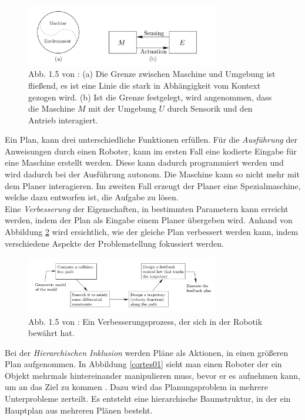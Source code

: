 \begin{figure} %
	\centering
	\includegraphics[width=0.75\textwidth]{images/img224.png}
	\caption{Abb. 1.5 von \cite[~S. 20]{Lav06}:  (a) Die Grenze zwischen Maschine und Umgebung ist fließend, es ist eine Linie die stark in Abhängigkeit vom Kontext gezogen wird. (b) Ist die Grenze festgelegt, wird angenommen, dass die Maschine $M$ mit der Umgebung $U$ durch Sensorik und den Antrieb interagiert.}
	\label{lav01}
\end{figure}
\noindent
Ein Plan, kann drei unterschiedliche Funktionen erfüllen.
Für die \textit{Ausführung} der Anweisungen durch einen Roboter, kann im ersten Fall eine kodierte Eingabe für eine Maschine erstellt werden. 
Diese kann dadurch programmiert werden und wird dadurch bei der Ausführung autonom. Die Maschine kann so nicht mehr mit dem Planer interagieren.
Im zweiten Fall erzeugt der Planer eine Spezialmaschine, welche dazu entworfen ist, die Aufgabe zu lösen.\cite[~S. 21]{Lav06}\newline\\
Eine \textit{Verbesserung} der Eigenschaften, in bestimmten Parametern kann erreicht werden, indem der Plan als Eingabe einem Planer übergeben wird. Anhand von Abbildung \ref{lav02} wird ersichtlich, wie der gleiche Plan verbessert werden kann, indem verschiedene Aspekte der Problemstellung fokussiert werden.\cite[~S. 22]{Lav06}
\begin{figure}
	\centering
	\includegraphics[width=0.75\textwidth]{images/img247.png}
	\caption{Abb. 1.5 von \cite[~S. 20]{Lav06}:  Ein Verbesserungsprozess, der sich in der Robotik bewährt hat.}
	\label{lav02}
\end{figure}

\noindent
Bei der \textit{Hierarchischen Inklusion} werden Pläne als Aktionen, in einen größeren Plan aufgenommen. In Abbildung \ref{cortes01} sieht man einen Roboter der ein Objekt mehrmals hintereinander manipulieren muss, bevor er es aufnehmen kann, um an das Ziel zu kommen \cite{cortes:03}. Dazu wird das Planungsproblem in mehrere Unterprobleme zerteilt. Es entsteht eine hierarchische Baumstruktur, in der ein Hauptplan aus mehreren Plänen besteht\cite[~S. 23]{Lav06}.

